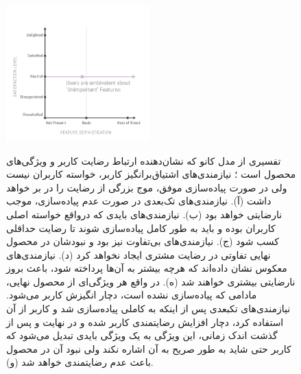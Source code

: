 \begin{figure}[H]
{		\includegraphics[width=5.5cm]{Resources/kano_unimportant.PNG}
	}
	\hspace{0mm}
	\caption[تفسیری از مدل کانو]
	{تفسیری از مدل کانو که نشان‌دهنده ارتباط رضایت کاربر و ویژگی‌های محصول است
		\cite{noauthor_leveraging_2012}؛
		نیازمندی‌های اشتیاق‌برانگیز کاربر، خواسته کاربران نیست ولی در صورت پیاده‌سازی موفق، موج بزرگی از رضایت را در بر خواهد داشت (آ). نیازمندی‌های تک‌بعدی در صورت عدم پیاده‌سازی، موجب نارضایتی خواهد بود (ب). نیازمندی‌های بایدی که درواقع خواسته اصلی کاربران بوده و باید به طور کامل پیاده‌سازی شوند تا رضایت حداقلی کسب شود (ج). نیازمندی‌های بی‌تفاوت نیز بود و نبودشان در محصول نهایی تفاوتی در رضایت مشتری ایجاد نخواهد کرد (د). نیازمندی‌های معکوس نشان داده‌اند که هرچه بیشتر به آن‌ها پرداخته شود، باعث بروز نارضایتی بیشتری خواهند شد (ه). در واقع هر ویژگی‌ای از محصول نهایی، مادامی که پیاده‌سازی نشده است، دچار انگیزش کاربر می‌شود. نیازمندی‌های تکبعدی پس از اینکه به کاملی پیاده‌سازی شد و کاربر از آن استفاده کرد، دچار افزایش رضایتمندی کاربر شده و در نهایت و پس از گذشت اندک زمانی، این ویژگی به یک ویژگی بایدی تبدیل می‌شود که کاربر حتی شاید به طور صریح به آن اشاره نکند ولی نبود آن در محصول باعث عدم رضایتمندی خواهد شد (و).
	}
	\label{fig:kano2}
\end{figure}
